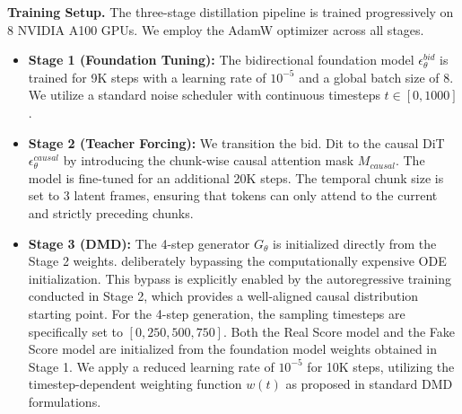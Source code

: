 \documentclass{llmxive}
\begin{document}
\noindent \textbf{Training Setup.} The three-stage distillation pipeline is trained progressively on 8 NVIDIA A100 GPUs. We employ the AdamW optimizer across all stages. 
\begin{itemize}
    \item \textbf{Stage 1 (Foundation Tuning):} The bidirectional foundation model $\epsilon_{\theta}^{bid}$ is trained for 9K steps with a learning rate of $10^{-5}$ and a global batch size of 8. We utilize a standard noise scheduler with continuous timesteps $t \in [0, 1000]$.
    \item \textbf{Stage 2 (Teacher Forcing):} We transition the bid. Dit to the causal DiT $\epsilon_{\theta}^{causal}$ by introducing the chunk-wise causal attention mask $M_{causal}$. The model is fine-tuned for an additional 20K steps. The temporal chunk size is set to 3 latent frames, ensuring that tokens can only attend to the current and strictly preceding chunks.
    \item \textbf{Stage 3 (DMD):} The 4-step generator $G_{\theta}$ is initialized directly from the Stage 2 weights. deliberately bypassing the computationally expensive ODE initialization. This bypass is explicitly enabled by the autoregressive training conducted in Stage 2, which provides a well-aligned causal distribution starting point. For the 4-step generation, the sampling timesteps are specifically set to $[0, 250, 500, 750]$. Both the Real Score model and the Fake Score model are initialized from the foundation model weights obtained in Stage 1. We apply a reduced learning rate of $10^{-5}$ for 10K steps, utilizing the timestep-dependent weighting function $w(t)$ as proposed in standard DMD formulations.

\end{itemize}
\end{document}
